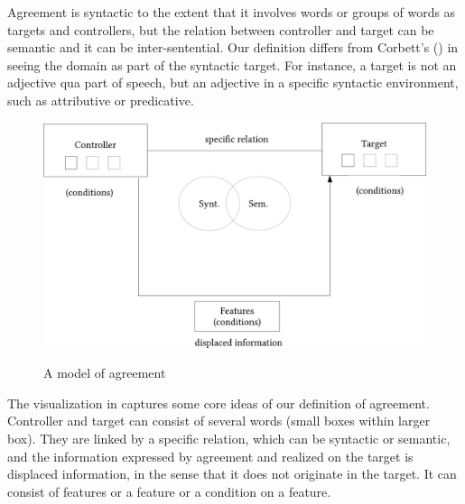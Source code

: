 \documentclass[output=collectionpaper]{langsci/langscibook}
\begin{document}
Agreement is syntactic to the extent that it involves words or groups of words as targets and controllers, but the relation between controller and target can be semantic and it can be inter-sentential. Our definition differs from Corbett's (\citealt*[4]{Corbett2006}) in seeing the domain as part of the syntactic target. For instance, a target is not an adjective qua part of speech, but an adjective in a specific syntactic environment, such as attributive or predicative.

\begin{figure}
\caption{A model of agreement}
\includegraphics[width=\textwidth]{figures/14/fig3}
\label{fig:WDG:3}
\end{figure}

The visualization in  captures some core ideas of our definition of agreement. Controller and target can consist of several words (small boxes within larger box). They are linked by a specific relation, which can be syntactic or semantic, and the information expressed by agreement and realized on the target is displaced information, in the sense that it does not originate in the target. It can consist of features or a feature or a condition on a feature.
\end{document}
